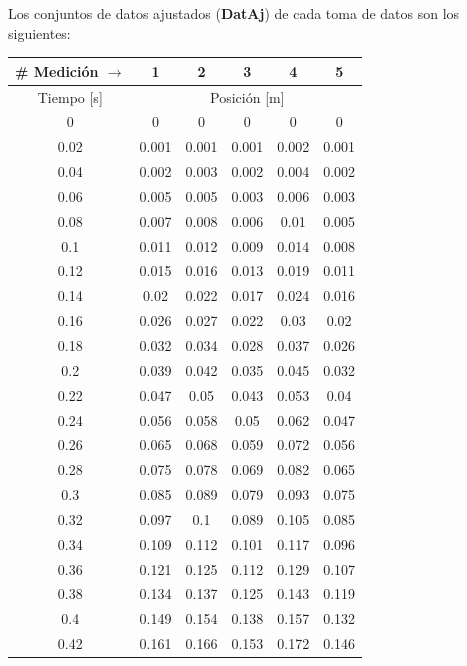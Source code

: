\documentclass[12pt, titlepage]{report}
\begin{document}
    Los conjuntos de datos ajustados (\textbf{DatAj}) de cada toma de datos son los siguientes:

    \begin{longtable}{|c|c|c|c|c|c|}
        \hline
        \# Medición $\rightarrow$ & 1 & 2 & 3 & 4 & 5 \\ \hline
        Tiempo [s] & \multicolumn{5}{c|}{Posición [m]} \\ \hline
        0 & 0 & 0 & 0 & 0 & 0 \\ \hline
        0.02 & 0.001 & 0.001 & 0.001 & 0.002 & 0.001 \\ \hline
        0.04 & 0.002 & 0.003 & 0.002 & 0.004 & 0.002 \\ \hline
        0.06 & 0.005 & 0.005 & 0.003 & 0.006 & 0.003 \\ \hline
        0.08 & 0.007 & 0.008 & 0.006 & 0.01 & 0.005 \\ \hline
        0.1 & 0.011 & 0.012 & 0.009 & 0.014 & 0.008 \\ \hline
        0.12 & 0.015 & 0.016 & 0.013 & 0.019 & 0.011 \\ \hline
        0.14 & 0.02 & 0.022 & 0.017 & 0.024 & 0.016 \\ \hline
        0.16 & 0.026 & 0.027 & 0.022 & 0.03 & 0.02 \\ \hline
        0.18 & 0.032 & 0.034 & 0.028 & 0.037 & 0.026 \\ \hline
        0.2 & 0.039 & 0.042 & 0.035 & 0.045 & 0.032 \\ \hline
        0.22 & 0.047 & 0.05 & 0.043 & 0.053 & 0.04 \\ \hline
        0.24 & 0.056 & 0.058 & 0.05 & 0.062 & 0.047 \\ \hline
        0.26 & 0.065 & 0.068 & 0.059 & 0.072 & 0.056 \\ \hline
        0.28 & 0.075 & 0.078 & 0.069 & 0.082 & 0.065 \\ \hline
        0.3 & 0.085 & 0.089 & 0.079 & 0.093 & 0.075 \\ \hline
        0.32 & 0.097 & 0.1 & 0.089 & 0.105 & 0.085 \\ \hline
        0.34 & 0.109 & 0.112 & 0.101 & 0.117 & 0.096 \\ \hline
        0.36 & 0.121 & 0.125 & 0.112 & 0.129 & 0.107 \\ \hline
        0.38 & 0.134 & 0.137 & 0.125 & 0.143 & 0.119 \\ \hline
        0.4 & 0.149 & 0.154 & 0.138 & 0.157 & 0.132 \\ \hline
        0.42 & 0.161 & 0.166 & 0.153 & 0.172 & 0.146 \\ \hline

\end{longtable}
\end{document}
